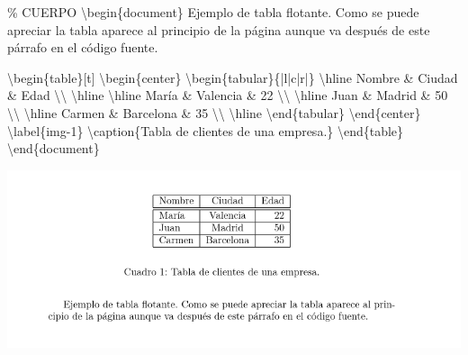 \documentclass[
  letterpaper,
  DIV=11,
  numbers=noendperiod]{scrreport}
\newenvironment{Shaded}{\begin{snugshade}}{\end{snugshade}}
\newcommand{\CommentTok}[1]{\textcolor[rgb]{0.37,0.37,0.37}{#1}}
\newcommand{\ExtensionTok}[1]{\textcolor[rgb]{0.00,0.23,0.31}{#1}}
\newcommand{\FunctionTok}[1]{\textcolor[rgb]{0.28,0.35,0.67}{#1}}
\newcommand{\KeywordTok}[1]{\textcolor[rgb]{0.00,0.23,0.31}{#1}}
\newcommand{\NormalTok}[1]{\textcolor[rgb]{0.00,0.23,0.31}{#1}}
\newcommand{\OperatorTok}[1]{\textcolor[rgb]{0.37,0.37,0.37}{#1}}
\begin{document}
\begin{Shaded}
\begin{Highlighting}[]
\CommentTok{\% CUERPO}
\KeywordTok{\textbackslash{}begin}\NormalTok{\{}\ExtensionTok{document}\NormalTok{\}}
\NormalTok{Ejemplo de tabla flotante. Como se puede apreciar la tabla aparece al }
\NormalTok{principio de la página aunque va después de este párrafo en el código }
\NormalTok{fuente.}

\KeywordTok{\textbackslash{}begin}\NormalTok{\{}\ExtensionTok{table}\NormalTok{\}[t]}
\KeywordTok{\textbackslash{}begin}\NormalTok{\{}\ExtensionTok{center}\NormalTok{\}}
\KeywordTok{\textbackslash{}begin}\NormalTok{\{}\ExtensionTok{tabular}\NormalTok{\}\{|l|c|r|\}}
\FunctionTok{\textbackslash{}hline}
\NormalTok{Nombre }\OperatorTok{\&}\NormalTok{ Ciudad }\OperatorTok{\&}\NormalTok{ Edad }\FunctionTok{\textbackslash{}\textbackslash{}} 
\FunctionTok{\textbackslash{}hline}
\FunctionTok{\textbackslash{}hline}
\NormalTok{María }\OperatorTok{\&}\NormalTok{ Valencia }\OperatorTok{\&}\NormalTok{ 22 }\FunctionTok{\textbackslash{}\textbackslash{}}
\FunctionTok{\textbackslash{}hline}
\NormalTok{Juan }\OperatorTok{\&}\NormalTok{ Madrid }\OperatorTok{\&}\NormalTok{ 50 }\FunctionTok{\textbackslash{}\textbackslash{}}
\FunctionTok{\textbackslash{}hline}
\NormalTok{Carmen }\OperatorTok{\&}\NormalTok{ Barcelona }\OperatorTok{\&}\NormalTok{ 35 }\FunctionTok{\textbackslash{}\textbackslash{}}
\FunctionTok{\textbackslash{}hline}
\KeywordTok{\textbackslash{}end}\NormalTok{\{}\ExtensionTok{tabular}\NormalTok{\}}
\KeywordTok{\textbackslash{}end}\NormalTok{\{}\ExtensionTok{center}\NormalTok{\}}
\KeywordTok{\textbackslash{}label}\NormalTok{\{}\ExtensionTok{img{-}1}\NormalTok{\}}
\FunctionTok{\textbackslash{}caption}\NormalTok{\{Tabla de clientes de una empresa.\}}
\KeywordTok{\textbackslash{}end}\NormalTok{\{}\ExtensionTok{table}\NormalTok{\}}
\KeywordTok{\textbackslash{}end}\NormalTok{\{}\ExtensionTok{document}\NormalTok{\}}
\end{Highlighting}
\end{Shaded}

\begin{tcolorbox}[enhanced jigsaw, arc=.35mm, toprule=.15mm, opacitybacktitle=0.6, colback=white, coltitle=black, colbacktitle=quarto-callout-note-color!10!white, breakable, colframe=quarto-callout-note-color-frame, left=2mm, opacityback=0, bottomtitle=1mm, toptitle=1mm, titlerule=0mm, title={Salida}, bottomrule=.15mm, leftrule=.75mm, rightrule=.15mm]
\includegraphics{./img/entornos-flotantes/tabla-flotante.png}
\end{tcolorbox}
\end{document}
